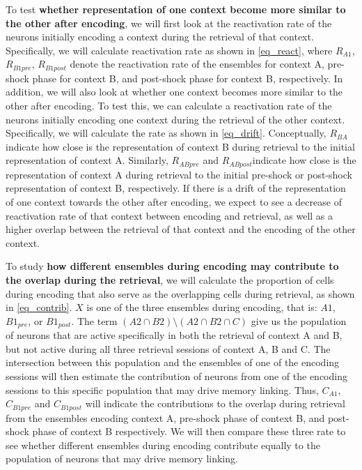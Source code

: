 \documentclass[master.tex]{subfiles}
\begin{document}
To test \textbf{whether representation of one context become more similar to the
  other after encoding}, we will first look at the reactivation rate of the
neurons initially encoding a context during the retrieval of that context.
Specifically, we will calculate reactivation rate as shown in
\autoref{eq_react}, where $R_{A1}$, $R_{B1pre}$, $R_{B1post}$ denote the
reactivation rate of the ensembles for context A, pre-shock phase for context B,
and post-shock phase for context B, respectively. In addition, we will also look
at whether one context becomes more similar to the other after encoding. To test
this, we can calculate a reactivation rate of the neurons initially encoding one
context during the retrieval of the other context. Specifically, we will
calculate the rate as shown in \autoref{eq_drift}. Conceptually, $R_{BA}$
indicate how close is the representation of context B during retrieval to the
initial representation of context A. Similarly, $R_{ABpre}$ and
$R_{ABpost}$indicate how close is the representation of context A during
retrieval to the initial pre-shock or post-shock representation of context B,
respectively. If there is a drift of the representation of one context towards
the other after encoding, we expect to see a decrease of reactivation rate of
that context between encoding and retrieval, as well as a higher overlap between
the retrieval of that context and the encoding of the other context.

To study \textbf{how different ensembles during encoding may contribute to the
  overlap during the retrieval}, we will calculate the proportion of cells
during encoding that also serve as the overlapping cells during retrieval, as
shown in \autoref{eq_contrib}. $X$ is one of the three ensembles during
encoding, that is: $A1$, $B1_{pre}$, or $B1_{post}$. The term $(A2 \cap B2)
\setminus (A2 \cap B2 \cap C)$ give us the population of neurons that are active
specifically in both the retrieval of context A and B, but not active during all
three retrieval sessions of context A, B and C. The intersection between this
population and the ensembles of one of the encoding sessions will then estimate
the contribution of neurons from one of the encoding sessions to this specific
population that may drive memory linking. Thus, $C_{A1}$, $C_{B1pre}$ and
$C_{B1post}$ will indicate the contributions to the overlap during retrieval
from the ensembles encoding context A, pre-shock phase of context B, and
post-shock phase of context B respectively. We will then compare these three
rate to see whether different ensembles during encoding contribute equally to
the population of neurons that may drive memory linking.
\end{document}
